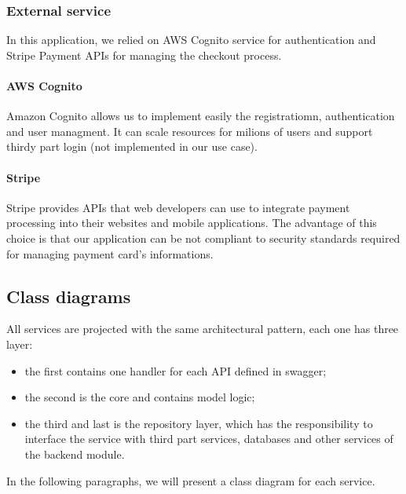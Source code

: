 \subsubsection{External service}\label{_architectureExternalServices}
In this application, we relied on AWS Cognito service for authentication and Stripe Payment APIs for managing the checkout process.
\paragraph*{AWS Cognito}
Amazon Cognito allows us to implement easily the registratiomn, authentication and user managment.
It can scale resources for milions of users and support thirdy part login (not implemented in our use case).

\paragraph*{Stripe}
Stripe provides APIs that web developers can use to integrate payment processing into their websites and mobile applications.
The advantage of this choice is that our application can be not compliant to security standards required for managing payment card's informations.

\subsection{Class diagrams}\label{_classDiagram}
All services are projected with the same architectural pattern, each one has three layer:
\begin{itemize}
    \item the first contains one handler for each API defined in swagger;
    \item the second is the core and contains model logic;
    \item the third and last is the repository layer, which has the responsibility to interface the
          service with third part services, databases and other services of the backend module.
\end{itemize}
In the following paragraphs, we will present a class diagram for each service.


